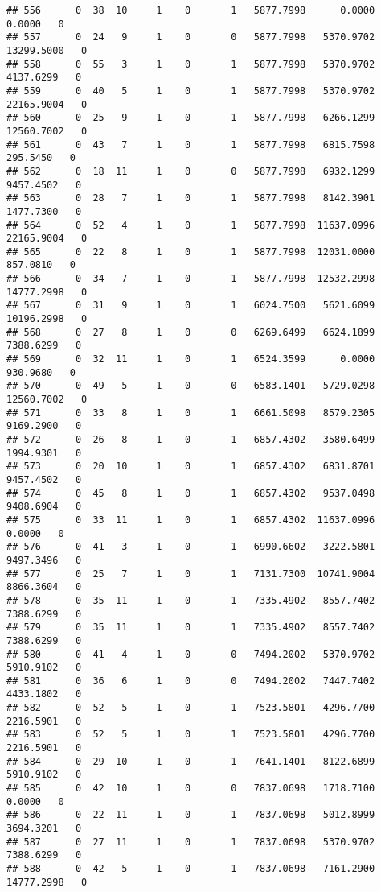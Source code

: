 \documentclass[
]{article}
\begin{document}
\begin{enumerate}
\begin{verbatim}
## 556      0  38  10     1    0       1   5877.7998      0.0000      0.0000   0
## 557      0  24   9     1    0       0   5877.7998   5370.9702  13299.5000   0
## 558      0  55   3     1    0       1   5877.7998   5370.9702   4137.6299   0
## 559      0  40   5     1    0       1   5877.7998   5370.9702  22165.9004   0
## 560      0  25   9     1    0       1   5877.7998   6266.1299  12560.7002   0
## 561      0  43   7     1    0       1   5877.7998   6815.7598    295.5450   0
## 562      0  18  11     1    0       0   5877.7998   6932.1299   9457.4502   0
## 563      0  28   7     1    0       1   5877.7998   8142.3901   1477.7300   0
## 564      0  52   4     1    0       1   5877.7998  11637.0996  22165.9004   0
## 565      0  22   8     1    0       1   5877.7998  12031.0000    857.0810   0
## 566      0  34   7     1    0       1   5877.7998  12532.2998  14777.2998   0
## 567      0  31   9     1    0       1   6024.7500   5621.6099  10196.2998   0
## 568      0  27   8     1    0       0   6269.6499   6624.1899   7388.6299   0
## 569      0  32  11     1    0       1   6524.3599      0.0000    930.9680   0
## 570      0  49   5     1    0       0   6583.1401   5729.0298  12560.7002   0
## 571      0  33   8     1    0       1   6661.5098   8579.2305   9169.2900   0
## 572      0  26   8     1    0       1   6857.4302   3580.6499   1994.9301   0
## 573      0  20  10     1    0       1   6857.4302   6831.8701   9457.4502   0
## 574      0  45   8     1    0       1   6857.4302   9537.0498   9408.6904   0
## 575      0  33  11     1    0       1   6857.4302  11637.0996      0.0000   0
## 576      0  41   3     1    0       1   6990.6602   3222.5801   9497.3496   0
## 577      0  25   7     1    0       1   7131.7300  10741.9004   8866.3604   0
## 578      0  35  11     1    0       1   7335.4902   8557.7402   7388.6299   0
## 579      0  35  11     1    0       1   7335.4902   8557.7402   7388.6299   0
## 580      0  41   4     1    0       0   7494.2002   5370.9702   5910.9102   0
## 581      0  36   6     1    0       0   7494.2002   7447.7402   4433.1802   0
## 582      0  52   5     1    0       1   7523.5801   4296.7700   2216.5901   0
## 583      0  52   5     1    0       1   7523.5801   4296.7700   2216.5901   0
## 584      0  29  10     1    0       1   7641.1401   8122.6899   5910.9102   0
## 585      0  42  10     1    0       0   7837.0698   1718.7100      0.0000   0
## 586      0  22  11     1    0       1   7837.0698   5012.8999   3694.3201   0
## 587      0  27  11     1    0       1   7837.0698   5370.9702   7388.6299   0
## 588      0  42   5     1    0       1   7837.0698   7161.2900  14777.2998   0

\end{verbatim}
\end{enumerate}
\end{document}
